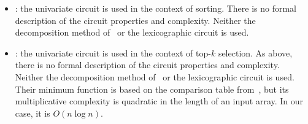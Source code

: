 \begin{itemize}
\item \cite{AINA:NGEG17}: the univariate circuit is used in the context of sorting. There is no formal description of the circuit properties and complexity. Neither the decomposition method of~\cite{TLWRK20} or the lexicographic circuit is used.

\item \cite{PoPETS:SFR20}: the univariate circuit is used in the context of top-$k$ selection. As above, there is no formal description of the circuit properties and complexity. Neither the decomposition method of~\cite{TLWRK20} or the lexicographic circuit is used. Their minimum function is based on the comparison table from~\cite{CDSS15}, but its multiplicative complexity is quadratic in the length of an input array. In our case, it is $O(n \log n)$.

\end{itemize}


  
